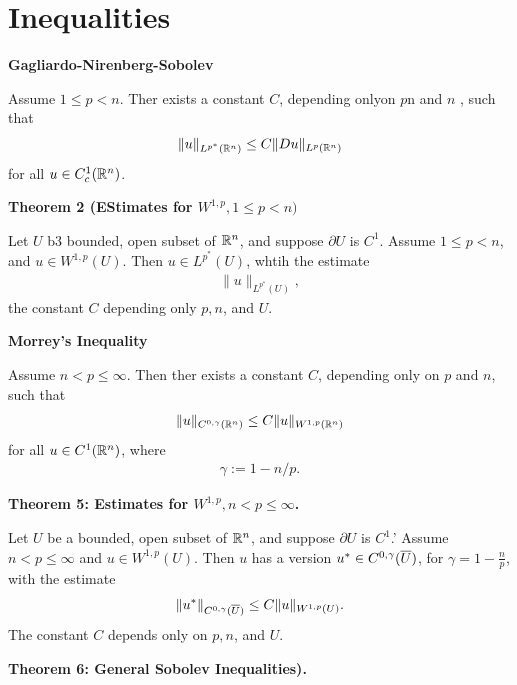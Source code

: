 \documentclass[12pt,a4paper]{report}
\begin{document}
\section{Inequalities}
\begin{description}
	\item \textbf{Gagliardo-Nirenberg-Sobolev}
	
	Assume $1\le p < n$.  Ther exists a constant $C$, depending onlyon $p$n and $n$ , such that 
	\begin{align*}
		\|u\|_{L^{p^*}(\mathbb{R}^n)} \le C\|Du\|_{L^p(\mathbb{R}^n)}
	\end{align*} for all $u \in C_c^1(\mathbb{R}^n)$.
	
	\item \textbf{Theorem 2 (EStimates for $W^{1,p}, 1 \le p < n)$}
	
	Let $U$ b3 bounded, open subset of $\mathbb{R}^n$, and suppose $\partial U$ is $C^1$.  Assume $1 \le p < n$, and $u\in W^{1,p}(U)$.  Then $u \in L^{p^*}(U)$, whtih the estimate 
	\begin{align*}
		\|u\|_{L^{p^*}(U)},
	\end{align*}the constant $C$ depending only $p,n$, and $U$.
	
	\item \textbf{Morrey's Inequality}
	
	Assume $n < p \le \infty$.  Then ther exists a constant $C$, depending only on $p$ and $n$, such that 
	\begin{align*}
		\|u\|_{C^{0,\gamma}(\mathbb{R}^n)} \le C\|u\|_{W^{1,p}(\mathbb{R}^n)}
	\end{align*}for all $u \in C^1(\mathbb{R}^n)$, where
	\begin{align*}
		\gamma := 1-n/p.
	\end{align*}
	
	\item \textbf{Theorem 5: Estimates for $W^{1,p}, n < p \le \infty$.}
	
	Let $U$ be a bounded, open subset of $\mathbb{R}^n$, and suppose $\partial U$ is $C^1$.'  Assume $n < p \le \infty$ and $u \in W^{1,p}(U)$.  Then $u$ has a version $u^*\in C^{0,\gamma}(\overline{U})$, for $\gamma = 1-\frac{n}{p}$, with the estimate 
	\begin{align*}
		\|u^*\|_{C^{0,\gamma}(\overline{U})} \le C\|u\|_{W^{1,p}(U)}.
	\end{align*}The constant $C$ depends only on $p,n$, and $U$.
	
	\item \textbf{Theorem 6: General Sobolev Inequalities).}
	

\end{description}
\end{document}
